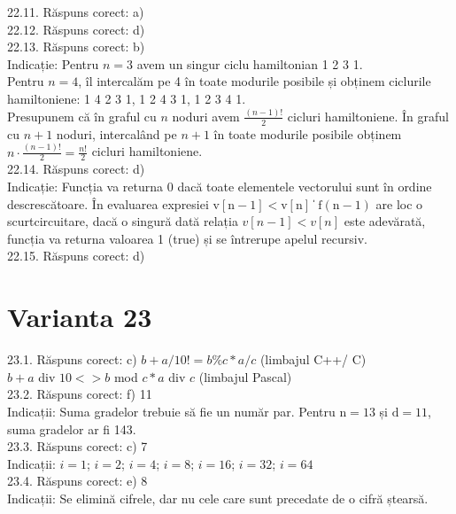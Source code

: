 22.11. Răspuns corect: a)\\

22.12. Răspuns corect: d)\\

22.13. Răspuns corect: b)\\
Indicație: Pentru $n=3$ avem un singur ciclu hamiltonian 1 2 3 1.\\ Pentru $n=4$, îl intercalăm pe 4 în toate modurile posibile și obținem ciclurile hamiltoniene: 1 4 2 3 1, 1 2 4 3 1, 1 2 3 4 1.\\ Presupunem că în graful cu $n$ noduri avem $\frac{(n-1)!}{2}$ cicluri hamiltoniene. În graful cu $n+1$ noduri, intercalând pe $n+1$ în toate modurile posibile obținem $n \cdot \frac{(n-1)!}{2}=\frac{n!}{2}$ cicluri hamiltoniene.\\

22.14. Răspuns corect: d)\\
Indicație: Funcția va returna 0 dacă toate elementele vectorului sunt în ordine descrescătoare. În evaluarea expresiei $\mathrm{v}[\mathrm{n}-1]<\mathrm{v}[\mathrm{n}]$ \| $\mathrm{f}(\mathrm{n}-1)$ are loc o scurtcircuitare, dacă o singură dată relația $v[n-1]<v[n]$ este adevărată, funcția va returna valoarea 1 (true) și se întrerupe apelul recursiv.\\

22.15. Răspuns corect: d)\\

\section*{Varianta 23}

23.1. Răspuns corect: c) $b+a / 10!=b \% c * a / c$ (limbajul C++/ C)\\ $b+a$ div $10<>b$ mod $c * a$ div $c$ (limbajul Pascal)\\

23.2. Răspuns corect: f) 11\\
Indicații: Suma gradelor trebuie să fie un număr par. Pentru $\mathrm{n}=13$ și $\mathrm{d}=11$, suma gradelor ar fi 143.\\

23.3. Răspuns corect: c) 7\\
Indicații: $i=1$; $i=2$; $i=4$; $i=8$; $i=16$; $i=32$; $i=64$\\

23.4. Răspuns corect: e) 8\\
Indicații: Se elimină cifrele, dar nu cele care sunt precedate de o cifră ștearsă.\\


